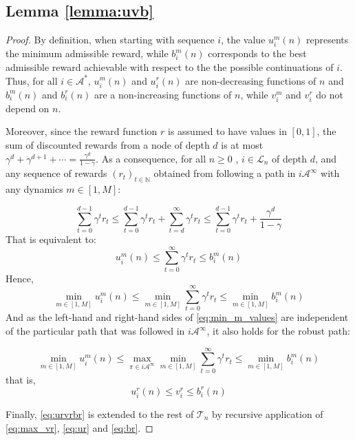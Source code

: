 \documentclass{article}
\begin{document}
\subsection{Lemma \ref{lemma:uvb}}
\label{appendix:proof-lemma}
\begin{proof}

By definition, when starting with sequence $i$, the value $u_i^m(n)$ represents the minimum admissible reward, while $b_i^m(n)$ corresponds to the best admissible reward achievable with respect to the the possible continuations of $i$. Thus, for all $i\in\mathcal{A}^*$, $u_i^m(n)$ and $u_i^r(n)$ are non-decreasing functions of $n$ and $b_i^m(n)$ and $b_i^r(n)$ are a non-increasing functions of $n$, while $v_i^m$ and $v_i^r$ do not depend on $n$.

Moreover, since the reward function $r$ is assumed to have values in $[0, 1]$, the sum of discounted rewards from a node of depth $d$ is at most $\gamma^d + \gamma^{d+1}+\cdots = \frac{\gamma^d}{1-\gamma}$. As a consequence, for all $n \geq 0$ , $i\in\mathcal{L}_n$ of depth $d$, and any sequence of rewards $(r_t)_{t\in\mathbb{N}}$ obtained from following a path in $i\mathcal{A}^\infty$ with any dynamics $m \in [1, M]$:

\begin{equation*}
\sum_{t=0}^{d-1} \gamma^t r_t \leq \sum_{t=0}^{d-1} \gamma^t r_t + \sum_{t=d}^\infty \gamma^t r_t \leq \sum_{t=0}^{d-1} \gamma^t r_t + \frac{\gamma^d}{1-\gamma}
\end{equation*}
That is equivalent to:
\begin{equation*}
u^m_i(n) \leq \sum_{t=0}^\infty \gamma^t r_t \leq b^m_i(n) 
\end{equation*}
Hence,
\begin{equation}
\label{eq:min_m_values}
\min_{m \in [1, M]} u^m_i(n) \leq \min_{m \in [1, M]} \sum_{t=0}^\infty \gamma^t r_t \leq \min_{m \in [1, M]} b^m_i(n)
\end{equation}
And as the left-hand and right-hand sides of \eqref{eq:min_m_values} are independent of the particular path that was followed in $i\mathcal{A}^\infty$, it also holds for the robust path:

\begin{equation*}
\min_{m \in [1, M]} u^m_i(n) \leq \max_{\pi\in i\mathcal{A}^\infty} \min_{m \in [1, M]} \sum_{t=0}^\infty \gamma^t r_t \leq \min_{m \in [1, M]} b^m_i(n)
\end{equation*}
that is,
\begin{equation}
\label{eq:urvrbr}
u^r_i(n) \leq v^r_i  \leq b^r_i(n)
\end{equation}

Finally, \eqref{eq:urvrbr} is extended to the rest of $\mathcal{T}_n$ by recursive application of \eqref{eq:max_vr}, \eqref{eq:ur} and \eqref{eq:br}.
\end{proof}
\end{document}
